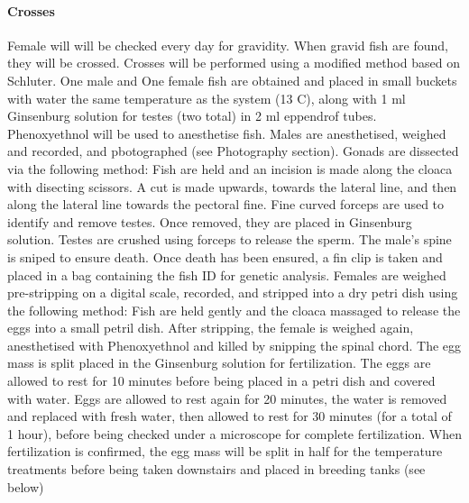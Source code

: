 \documentclass[12pt]{extarticle}
\begin{document}
\paragraph{Crosses}
Female will will be checked every day for gravidity. When gravid fish are found, they will be crossed.
Crosses will be performed using a modified method based on Schluter. One male and One female fish are obtained and placed in small buckets with water the same temperature as the system (13 \degree C), along with 1 ml Ginsenburg solution for testes (two total) in 2 ml eppendrof tubes. Phenoxyethnol will be used to anesthetise fish. Males are anesthetised, weighed and recorded, and pbotographed (see Photography section). Gonads are dissected via the following method:
Fish are held and an incision is made along the cloaca with disecting scissors. A cut is made upwards, towards the lateral line, and then along the lateral line towards the pectoral fine. Fine curved forceps are used to identify and remove testes. Once removed, they are placed in Ginsenburg solution.
Testes are crushed using forceps to release the sperm. The male's spine is sniped to ensure death. Once death has been ensured, a fin clip is taken and placed in a bag containing the fish ID for genetic analysis.
Females are weighed pre-stripping on a digital scale, recorded, and stripped into a dry petri dish using the following method:
Fish are held gently and the cloaca massaged to release the eggs into a small petril dish. After stripping, the female is weighed again, anesthetised with Phenoxyethnol and killed by snipping the spinal chord. The egg mass is split placed in the Ginsenburg solution for fertilization.
 The eggs are allowed to rest for 10 minutes before being placed in a petri dish and covered with water. Eggs are allowed to rest again for 20 minutes, the water is removed and replaced with fresh water, then allowed to rest for 30 minutes (for a total of 1 hour), before being checked under a microscope for complete fertilization. When fertilization is confirmed, the egg mass will be split in half for the temperature treatments before being taken downstairs and placed in breeding tanks (see below)
 
\end{document}

